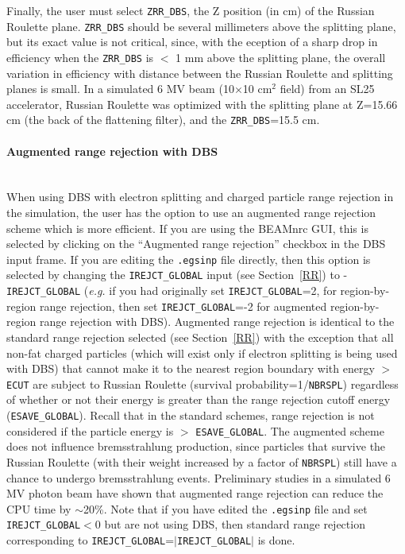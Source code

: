 \documentclass[12pt,twoside]{article}
\begin{document}
Finally, the user must select {\tt ZRR\_DBS}, the Z position (in cm) of the
Russian Roulette plane.  {\tt ZRR\_DBS} should be several millimeters
above the splitting plane, but its exact value is not critical, since,
with the eception of a sharp drop in efficiency when the
{\tt ZRR\_DBS} is $<$ 1 mm above the splitting plane,
the overall variation in efficiency with distance between the Russian
Roulette and splitting planes is small.
In a simulated 6 MV beam (10$\times$10 cm$^2$ field) from an SL25
accelerator, Russian Roulette was optimized with
the splitting plane at Z=15.66 cm (the back of the flattening filter),
and the {\tt ZRR\_DBS}=15.5 cm.

\paragraph{Augmented range rejection with DBS}\mbox{}\\
When using DBS with electron splitting
and charged particle range rejection in the simulation,
the user has the option to use an augmented range rejection scheme which
is more efficient.  If you are using the BEAMnrc GUI, this is selected
by clicking on the ``Augmented range rejection'' checkbox in the DBS
input frame.  If you are editing the {\tt .egsinp} file directly, then
this option is selected by changing the {\tt IREJCT\_GLOBAL} input
(see Section~\ref{RR}) to -{\tt IREJCT\_GLOBAL} ({\em e.g.} if you
had originally set {\tt IREJCT\_GLOBAL}=2, for region-by-region range
rejection, then set {\tt IREJCT\_GLOBAL}=-2 for augmented
region-by-region range rejection with DBS).
Augmented range rejection is identical to the
standard range rejection selected
(see Section~\ref{RR}) with the
exception that all non-fat charged particles
(which will exist only if electron splitting is
being used with DBS) that cannot make it
to the nearest region boundary with energy $>$ {\tt ECUT} are subject
to Russian Roulette (survival probability=1/{\tt NBRSPL}) regardless
of whether or not their energy is greater than the range rejection
cutoff energy ({\tt ESAVE\_GLOBAL}).  Recall that in the standard
schemes, range rejection
is not considered if the particle energy is $>$ {\tt ESAVE\_GLOBAL}.  The
augmented scheme does not influence bremsstrahlung production, since particles
that survive the Russian Roulette (with their weight increased by a factor of
{\tt NBRSPL}) still have a chance to undergo bremsstrahlung events.
Preliminary studies in a simulated 6 MV photon beam
have shown that augmented range rejection can reduce the CPU time
by $\sim$20\%.  Note that if you have
edited the {\tt .egsinp} file and set {\tt IREJCT\_GLOBAL}$<$0
but are not using DBS, then standard range rejection corresponding to
{\tt IREJCT\_GLOBAL}=$|${\tt IREJCT\_GLOBAL}$|$ is done.
\end{document}
